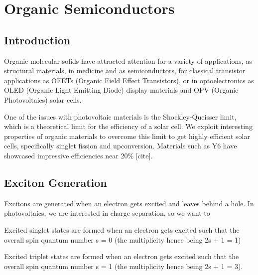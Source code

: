 
\chapter{Organic Semiconductors} %

\label{Chapter2} %


\section{Introduction}

Organic molecular solids have attracted attention for a variety of applications, as structural materials, in medicine and as semiconductors, for classical transistor applications as OFETs (Organic Field Effect Transistors), or in optoelectronics as OLED (Organic Light Emitting Diode) display materials and OPV (Organic Photovoltaics) solar cells.

One of the issues with photovoltaic materials is the Shockley-Queisser limit, which is a theoretical limit for the efficiency of a solar cell. We exploit interesting properties of organic materials to overcome this limit to get highly efficient solar cells, specifically singlet fission and upconversion. Materials such as Y6 have showcased impressive efficiencies near 20\%  [cite].

\section{Exciton Generation}

Excitons are generated when an electron gets excited and leaves behind a hole. In photovoltaics, we are interested in charge separation, so we want to %

Excited singlet states are formed when an electron gets excited such that the overall spin quantum number s = 0 (the multiplicity hence being 2s + 1 = 1)


Excited triplet states are formed when an electron gets excited such that the overall spin quantum number s = 1 (the multiplicity hence being 2s + 1 = 3). 

